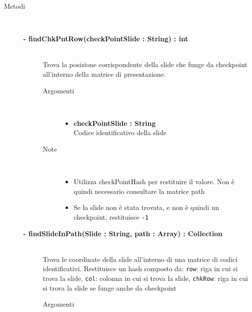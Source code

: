 \begin{description}
	
\item[Metodi] \hfill \\

	\begin{description}
		\item[\textbf{\color{blue}- findChkPntRow(checkPointSlide : String) : int			}] \hfill \\
			Trova la posizione corrispondente della slide che funge da checkpoint all'interno della matrice di presentazione.
			
		\begin{description}
			\item[Argomenti] \hfill \\
				\begin{itemize}
				
					\item \textbf{checkPointSlide : String		} \hfill \\
					Codice identificativo della slide
					
				\end{itemize}
			\item[Note] \hfill \\
			\begin{itemize}
					\item Utilizza checkPointHash per restituire il valore. Non è quindi necessario consultare la matrice path
					\item Se la slide non è stata trovata, e non è quindi un checkpoint, restituisce \texttt{-1}
			\end{itemize}
		\end{description}
	\end{description}
	
	\begin{description}
		\item[\textbf{\color{blue}- findSlideInPath(Slide : String, path : Array) : Collection			}] \hfill \\
			Trova le coordinate della slide all'interno di una matrice di codici identificativi. Restituisce un hash composto da: \texttt{row}: riga in cui si trova la slide, \texttt{col}: colonna in cui si trova la slide, \texttt{chkRow}: riga in cui si trova la slide se funge anche da checkpoint
			
		\begin{description}
			\item[Argomenti] \hfill \\
				\begin{itemize}
				

\end{itemize}
\end{description}
\end{description}
\end{description}
